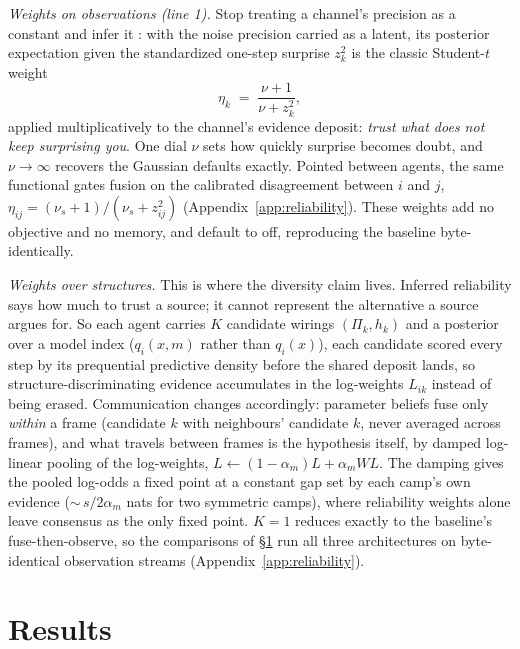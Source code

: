 \documentclass[runningheads]{llncs}
\begin{document}
\emph{Weights on observations (line 1).} Stop treating a channel's precision as a constant
and infer it \citep{ohagan2012}: with the noise precision carried as a latent, its
posterior expectation given the standardized one-step surprise $z_k^2$ is the classic
Student-$t$ weight
\begin{equation}
\eta_k \;=\; \frac{\nu+1}{\nu+z_k^2},
\label{eq:lambda}
\end{equation}
applied multiplicatively to the channel's evidence deposit: \emph{trust what does not keep
surprising you}. One dial $\nu$ sets how quickly surprise becomes doubt, and $\nu\to\infty$
recovers the Gaussian defaults exactly. Pointed between agents, the same functional
gates fusion on the calibrated disagreement between $i$ and $j$,
$\eta_{ij}=(\nu_s+1)/(\nu_s+z_{ij}^2)$ (Appendix~\ref{app:reliability}). These weights add no
objective and no memory, and default to off, reproducing the baseline byte-identically.

\emph{Weights over structures.}\label{sec:rivals}
This is where the diversity claim lives. Inferred reliability says how much to trust a
source; it cannot represent the alternative a source argues for. So each agent carries
$K$ candidate wirings $(\Pi_k,h_k)$ and a posterior over a model index ($q_i(x,m)$ rather
than $q_i(x)$), each candidate scored every step by its prequential predictive density
before the shared deposit lands, so structure-discriminating evidence accumulates in
the log-weights $L_{ik}$ instead of being erased. Communication changes accordingly:
parameter beliefs fuse only \emph{within} a frame (candidate $k$ with neighbours' candidate
$k$, never averaged across frames), and what travels between frames is the hypothesis itself,
by damped log-linear pooling of the log-weights, $L\leftarrow(1-\alpha_m)L+\alpha_m W L$. The
damping gives the pooled log-odds a fixed point at a constant gap set by each camp's own
evidence (${\sim}\,s/2\alpha_m$ nats for two symmetric camps), where reliability weights
alone leave consensus as the only fixed point. $K=1$ reduces exactly to the baseline's
fuse-then-observe, so the comparisons of \S\ref{sec:results} run all three architectures on
byte-identical observation streams (Appendix~\ref{app:reliability}).

\section{Results}
\label{sec:results}
\end{document}
